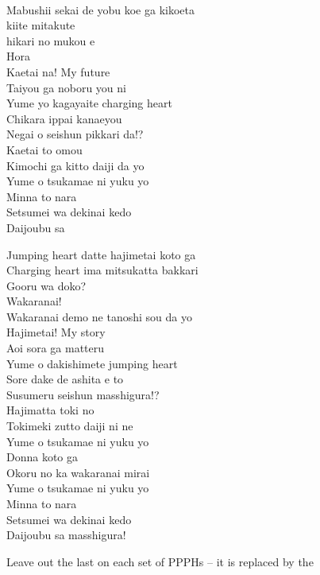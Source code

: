 \begin{multicols}{2}
\\
Mabushii sekai de yobu koe ga kikoeta\\
 kiite mitakute\\
 hikari no mukou e\\
Hora \\

Kaetai na! My future \\
Taiyou ga noboru you ni \\
Yume yo kagayaite charging heart\\
Chikara ippai kanaeyou\\
Negai o seishun pikkari da!?\\
Kaetai to omou \\
Kimochi ga kitto daiji da yo \\
Yume o tsukamae ni yuku yo\\
Minna to nara\\
Setsumei wa dekinai kedo\\
Daijoubu sa\\


Jumping heart datte hajimetai koto ga\\
Charging heart ima mitsukatta bakkari\\
Gooru wa doko? \\
Wakaranai!\\
Wakaranai demo ne tanoshi sou da yo\\

Hajimetai! My story\\
Aoi sora ga matteru \\
Yume o dakishimete jumping heart\\
Sore dake de ashita e to\\
Susumeru seishun masshigura!?\\
Hajimatta toki no \\
Tokimeki zutto daiji ni ne \\
Yume o tsukamae ni yuku yo\\
Donna koto ga\\
Okoru no ka wakaranai mirai\\
Yume o tsukamae ni yuku yo\\
Minna to nara\\
Setsumei wa dekinai kedo\\
Daijoubu sa masshigura!
\end{multicols}

{\small \calltext{*} Leave out the last  on each set of PPPHs -- it is replaced by the }

\ifdefined\COMPLETE
\else
	
\fi
